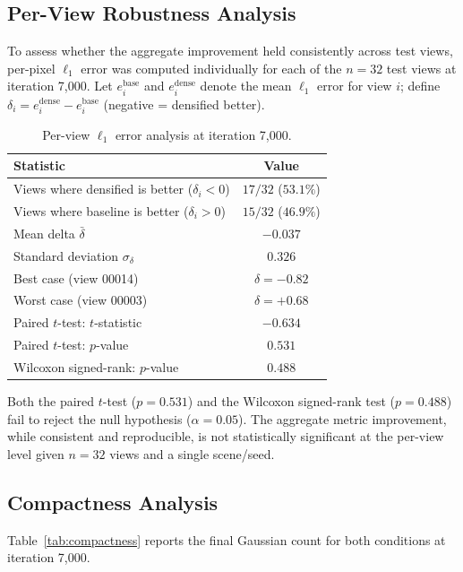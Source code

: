 \documentclass[12pt, a4paper]{article}
\begin{document}
\subsection{Per-View Robustness Analysis}
\label{sec:perviewstats}

To assess whether the aggregate improvement held consistently across test views,
per-pixel $\ell_1$ error was computed individually for each of the $n=32$ test
views at iteration 7{,}000. Let $e_i^\text{base}$ and $e_i^\text{dense}$ denote
the mean $\ell_1$ error for view $i$; define $\delta_i = e_i^\text{dense} -
e_i^\text{base}$ (negative = densified better).

\begin{table}[h]
\centering
\caption{Per-view $\ell_1$ error analysis at iteration 7{,}000.}
\label{tab:perviewstats}
\begin{tabular}{lc}
\toprule
\textbf{Statistic} & \textbf{Value} \\
\midrule
Views where densified is better ($\delta_i < 0$) & $17/32$ ($53.1\%$) \\
Views where baseline is better ($\delta_i > 0$) & $15/32$ ($46.9\%$) \\
Mean delta $\bar{\delta}$ & $-0.037$ \\
Standard deviation $\sigma_\delta$ & $0.326$ \\
Best case (view 00014) & $\delta = -0.82$ \\
Worst case (view 00003) & $\delta = +0.68$ \\
\midrule
Paired $t$-test: $t$-statistic & $-0.634$ \\
Paired $t$-test: $p$-value & $0.531$ \\
Wilcoxon signed-rank: $p$-value & $0.488$ \\
\bottomrule
\end{tabular}
\end{table}

Both the paired $t$-test ($p = 0.531$) and the Wilcoxon signed-rank test
($p = 0.488$) fail to reject the null hypothesis ($\alpha = 0.05$). The aggregate
metric improvement, while consistent and reproducible, is not statistically
significant at the per-view level given $n = 32$ views and a single scene/seed.

\subsection{Compactness Analysis}
\label{sec:compactness}

Table~\ref{tab:compactness} reports the final Gaussian count for both conditions
at iteration 7{,}000.
\end{document}
